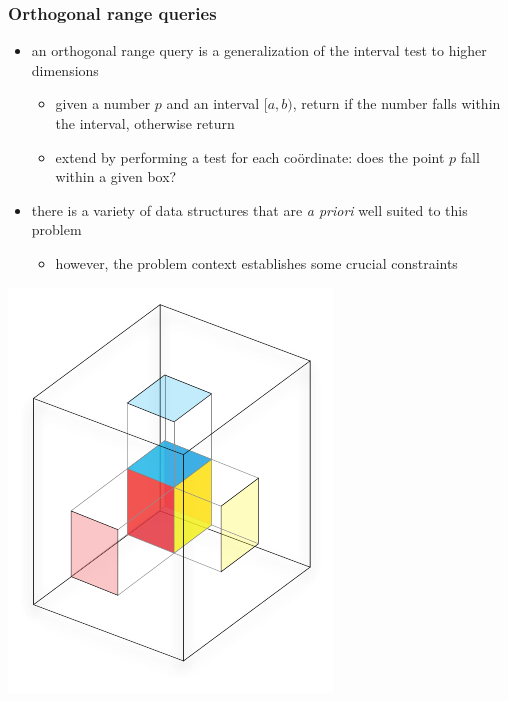 \begin{frame}[fragile]
%
  \frametitle{Orthogonal range queries}
%
  \begin{minipage}{.70\linewidth}
%
  \begin{itemize}
%
  \item an orthogonal range query is a generalization of the interval test to higher dimensions
    \begin{itemize}
    \item given a number $p$ and an interval $[a,b)$, return  if the number falls
    within the interval, otherwise return 
    \item extend by performing a test for each co\"ordinate: does the point $p$ fall within a
      given box?
    \end{itemize}
%
  \item there is a variety of data structures that are {\em a priori} well suited to this
    problem
    \begin{itemize}
    \item however, the problem context establishes some crucial constraints
    \end{itemize}
%
  \end{itemize}
%
  \end{minipage}
%
  \hfill
  \begin{minipage}{.27\linewidth}
    \includegraphics[scale=0.7]{figures/orq.pdf}
  \end{minipage} 
%
  \begin{itemize}

\end{itemize}
\end{frame}

